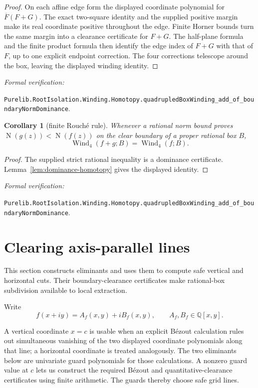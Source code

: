 \documentclass[11pt]{article}
\newtheorem{corollary}[theorem]{Corollary}
\newcommand{\Q}{\mathbb{Q}}
\newcommand{\Norm}[1]{\operatorname{N}\!\left(#1\right)}
\newcommand{\Wind}{\operatorname{Wind}}
\newcommand{\leanref}[1]{\par\smallskip\noindent
  \emph{Formal verification:}\par\nobreak
  {\raggedright\nolinkurl{#1}.\par}}
\begin{document}
\begin{proof}
On each affine edge form the displayed coordinate polynomial for
$\overline F(F+G)$.  The exact two-square identity and the supplied positive
margin make its real coordinate positive throughout the edge.  Finite Horner
bounds turn the same margin into a clearance certificate for $F+G$.
The half-plane formula and the finite product formula then identify the edge
index of $F+G$ with that of $F$, up to one explicit endpoint correction.
The four corrections telescope around the box, leaving the displayed winding
identity.
\end{proof}

\leanref{Purelib.RootIsolation.Winding.Homotopy.quadrupledBoxWinding_add_of_boundaryNormDominance}

\begin{corollary}[finite Rouché rule]
\label{cor:rouche}
Whenever a rational norm bound proves $\Norm{g(z)}<\Norm{f(z)}$ on the clear
boundary of a proper rational box $B$,
\[
        \Wind_4(f+g;B)=\Wind_4(f;B).
\]
\end{corollary}

\begin{proof}
The supplied strict rational inequality is a dominance certificate.
Lemma~\ref{lem:dominance-homotopy} gives the displayed identity.
\end{proof}

\leanref{Purelib.RootIsolation.Winding.Homotopy.quadrupledBoxWinding_add_of_boundaryNormDominance}

\section{Clearing axis-parallel lines}

This section constructs eliminants and uses them to compute safe vertical and
horizontal cuts.  Their boundary-clearance certificates make rational-box
subdivision available to local extraction.

Write
\[
 f(x+iy)=A_f(x,y)+iB_f(x,y),\qquad A_f,B_f\in\Q[x,y].
\]

A vertical coordinate $x=c$ is usable when an explicit B\'ezout calculation
rules out simultaneous vanishing of the two displayed coordinate
polynomials along that line; a horizontal coordinate is treated analogously.
The two eliminants below are univariate guard polynomials for those
calculations.  A nonzero guard value at $c$ lets us construct the required
B\'ezout and quantitative-clearance certificates using finite arithmetic.
The guards thereby choose safe grid lines.
\end{document}

